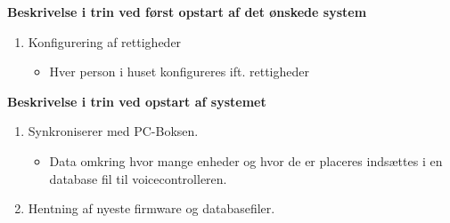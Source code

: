 
{\bf Beskrivelse i trin ved først opstart af det ønskede system}
\begin{enumerate}

    \item Konfigurering af rettigheder

    \begin{itemize}
        \item Hver person i huset konfigureres ift. rettigheder
    \end{itemize}

\end{enumerate}

{\bf Beskrivelse i trin ved opstart af systemet}
\begin{enumerate}
    \item Synkroniserer med PC-Boksen.
    
    \begin{itemize}
        \item Data omkring hvor mange enheder og hvor de er placeres indsættes i en database fil til voicecontrolleren.
    \end{itemize}

    \item Hentning af nyeste firmware og databasefiler.

    
\end{enumerate}



